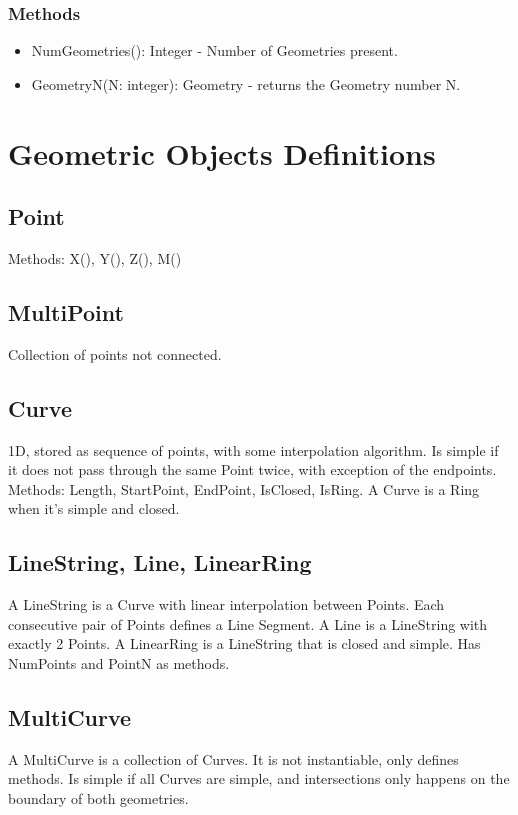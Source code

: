 \documentclass[11pt]{article}
\begin{document}
\subsubsection{Methods}
\begin{itemize}
\item NumGeometries(): Integer - Number of Geometries present.
\item GeometryN(N: integer): Geometry - returns the Geometry number N.
\end{itemize}

\section{Geometric Objects Definitions}
\subsection{Point}
Methods: X(), Y(), Z(), M()

\subsection{MultiPoint}
 Collection of points not connected.

\subsection{Curve}
1D, stored as sequence of points, with some interpolation algorithm. Is simple if it does not pass through the same Point twice, with exception of the endpoints. Methods: Length, StartPoint, EndPoint, IsClosed, IsRing. A Curve is a Ring when it's simple and closed. 

\subsection{LineString, Line, LinearRing}
A LineString is a Curve with linear interpolation between Points. Each consecutive pair of Points defines a Line Segment. A Line is a LineString with exactly 2 Points. A LinearRing is a LineString that is closed and simple. Has NumPoints and PointN as methods.

\subsection{MultiCurve}
A MultiCurve is a collection of Curves. It is not instantiable, only defines methods. Is simple if all Curves are simple, and intersections only happens on the boundary of both geometries.
\end{document}
